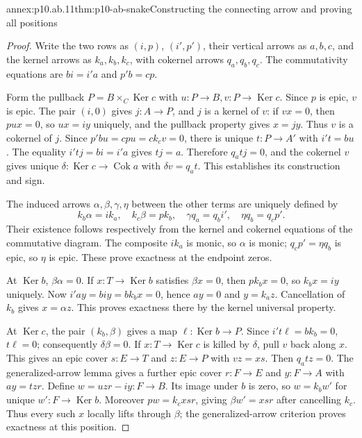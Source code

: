 \begin{annexitem}{annex:p10.ab.11}{thm:p10-ab-snake}{Constructing the connecting arrow and proving all positions}
\begin{proof}
Write the two rows as \((i,p)\), \((i',p')\), their vertical arrows
as \(a,b,c\), and the kernel arrows as \(k_a,k_b,k_c\), with
cokernel arrows \(q_a,q_b,q_c\). The commutativity equations are
\(bi=i'a\) and \(p'b=cp\).

Form the pullback \(P=B\times_C\operatorname{Ker}c\) with
\(u:P\to B,v:P\to\operatorname{Ker}c\). Since \(p\) is epic,
\(v\) is epic. The pair \((i,0)\) gives \(j:A\to P\), and
\(j\) is a kernel of \(v\): if \(vx=0\), then \(pux=0\),
so \(ux=iy\) uniquely, and the pullback property gives \(x=jy\).
Thus \(v\) is a cokernel of \(j\). Since
\(p'bu=cpu=ck_cv=0\), there is unique \(t:P\to A'\) with
\(i't=bu\). The equality \(i'tj=bi=i'a\) gives \(tj=a\).
Therefore \(q_atj=0\), and the cokernel \(v\) gives unique
\(\delta:\operatorname{Ker}c\to\operatorname{Cok}a\) with
\(\delta v=q_at\). This establishes its construction and sign.

The induced arrows \(\alpha,\beta,\gamma,\eta\) between the other
terms are uniquely defined by
\[
 k_b\alpha=ik_a,\quad k_c\beta=pk_b,\quad
 \gamma q_a=q_bi',\quad \eta q_b=q_cp'.
\]
Their existence follows respectively from the kernel and cokernel
equations of the commutative diagram. The composite \(ik_a\) is monic,
so \(\alpha\) is monic; \(q_cp'=\eta q_b\) is epic, so
\(\eta\) is epic. These prove exactness at the endpoint zeros.

At \(\operatorname{Ker}b\), \(\beta\alpha=0\). If
\(x:T\to\operatorname{Ker}b\) satisfies \(\beta x=0\), then
\(pk_bx=0\), so \(k_bx=iy\) uniquely. Now
\(i'ay=biy=bk_bx=0\), hence \(ay=0\) and \(y=k_az\).
Cancellation of \(k_b\) gives \(x=\alpha z\). This proves exactness
there by the kernel universal property.

At \(\operatorname{Ker}c\), the pair \((k_b,\beta)\) gives a
map \(\ell:\operatorname{Ker}b\to P\). Since \(i't\ell=bk_b=0\),
\(t\ell=0\); consequently \(\delta\beta=0\).
If \(x:T\to\operatorname{Ker}c\) is killed by \(\delta\), pull
\(v\) back along \(x\). This gives an epic cover \(s:E\to T\)
and \(z:E\to P\) with \(vz=xs\). Then \(q_atz=0\).
The generalized-arrow lemma gives a further epic cover \(r:F\to E\)
and \(y:F\to A\) with \(ay=tzr\). Define
\(w=uzr-iy:F\to B\). Its image under \(b\) is zero, so
\(w=k_bw'\) for unique \(w':F\to\operatorname{Ker}b\).
Moreover \(pw=k_cxsr\), giving \(\beta w'=xsr\) after cancelling
\(k_c\). Thus every such \(x\) locally lifts through \(\beta\);
the generalized-arrow criterion proves exactness at this position.


\end{proof}
\end{annexitem}
